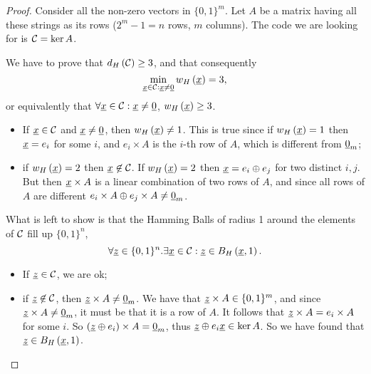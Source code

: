 \begin{proof}
	Consider all the non-zero vectors in $\{0, 1\}^m$.
	Let $A$ be a matrix having all these strings as its rows ($2^m-1 = n$ rows, $m$ columns).
	The code we are looking for is $\mathcal{C} = \ker A$.

	We have to prove that $d_H \left({\mathcal{C}}\right) \ge 3$, and that consequently
	\begin{equation*}
		\min_{\underline{x} \in \mathcal{C} : \underline{x} \neq \underline{0}} w_H\left(\underline{x}\right) = 3,
	\end{equation*}
	or equivalently that $\forall \underline{x} \in \mathcal{C} : \underline{x} \neq \underline{0}$, $w_H\left(\underline{x}\right) \geq 3$.
	\begin{itemize}
		\item If $\underline{x} \in \mathcal{C}$ and $\underline{x} \neq \underline{0}$, then $w_H\left(\underline{x}\right) \neq 1$.
			This is true since if $w_H\left(\underline{x}\right) = 1$ then $\underline{x} = e_i$ for some $i$, and $e_i \times A$ is the $i$-th row of $A$, which is different from $\underline{0}_m$;
		\item if $w_H\left(\underline{x}\right) = 2$ then $\underline{x} \not\in \mathcal{C}$.
			If $w_H\left(\underline{x}\right) = 2$ then $\underline{x} = e_i \oplus e_j$ for two distinct $i, j$.
			But then $\underline{x} \times A$ is a linear combination of two rows of $A$, and since all rows of $A$ are different $e_i \times A \oplus e_j \times A \neq \underline{0}_m$.
	\end{itemize}

	What is left to show is that the Hamming Balls of radius 1 around the elements of $\mathcal{C}$ fill up $\{0, 1\}^n$, \ie
	\begin{equation*}
		\forall \underline{z} \in \{0, 1\}^n .
		\exists \underline{x} \in \mathcal{C} :
		\underline{z} \in B_H\left(\underline{x}, 1\right).
	\end{equation*}

	\begin{itemize}
		\item If $\underline{z} \in \mathcal{C}$, we are ok;
		\item if $\underline{z} \not\in \mathcal{C}$, then $\underline{z} \times A \neq \underline{0}_m$.
			We have that $\underline{z} \times A \in \{0, 1\}^m$, and since $\underline{z} \times A \neq \underline{0}_m$, it must be that it is a row of $A$.
			It follows that $\underline{z} \times A = e_i \times A$ for some $i$.
			So $(\underline{z} \oplus e_i) \times A = \underline{0}_m$, thus $\underline{z} \oplus e_i \underline{x} \in \ker A$.
			So we have found that $\underline{z} \in B_H\left(\underline{x}, 1\right)$. \qedhere
	\end{itemize}
\end{proof}
